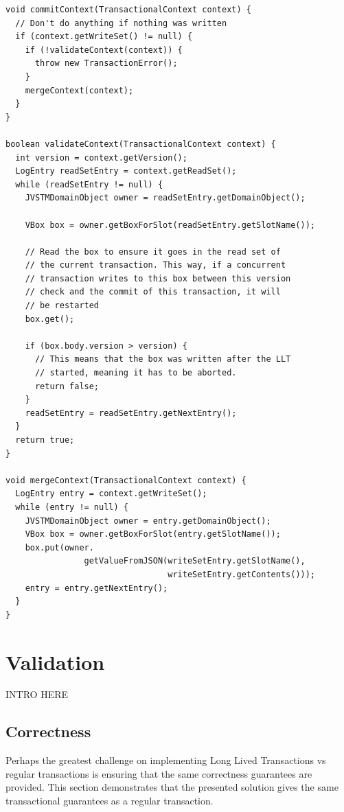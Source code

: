 \begin{lstlisting}[caption={Implementation of the Long Lived
    Transaction commit operation},float]
void commitContext(TransactionalContext context) {
  // Don't do anything if nothing was written
  if (context.getWriteSet() != null) {
    if (!validateContext(context)) {
      throw new TransactionError();
    }
    mergeContext(context);
  }
}

boolean validateContext(TransactionalContext context) {
  int version = context.getVersion();
  LogEntry readSetEntry = context.getReadSet();
  while (readSetEntry != null) {
    JVSTMDomainObject owner = readSetEntry.getDomainObject();

    VBox box = owner.getBoxForSlot(readSetEntry.getSlotName());

    // Read the box to ensure it goes in the read set of 
    // the current transaction. This way, if a concurrent 
    // transaction writes to this box between this version
    // check and the commit of this transaction, it will
    // be restarted
    box.get();

    if (box.body.version > version) {
      // This means that the box was written after the LLT
      // started, meaning it has to be aborted.
      return false;
    }
    readSetEntry = readSetEntry.getNextEntry();
  }
  return true;
}

void mergeContext(TransactionalContext context) {
  LogEntry entry = context.getWriteSet();
  while (entry != null) {
    JVSTMDomainObject owner = entry.getDomainObject();
    VBox box = owner.getBoxForSlot(entry.getSlotName());
    box.put(owner.
                getValueFromJSON(writeSetEntry.getSlotName(), 
                                 writeSetEntry.getContents()));
    entry = entry.getNextEntry();
  }
}
\end{lstlisting}

\section{Validation}
\label{sec:validation}

INTRO HERE

\subsection{Correctness}

Perhaps the greatest challenge on implementing Long Lived Transactions
vs regular transactions is ensuring that the same correctness
guarantees are provided. This section demonstrates that the presented
solution gives the same transactional guarantees as a regular transaction.

